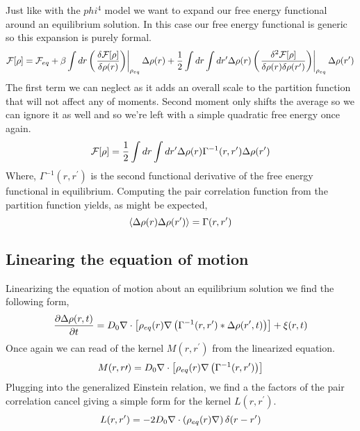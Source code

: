 Just like with the $phi^4$ model we want to expand our free energy functional
around an equilibrium solution. In this case our free energy functional is
generic so this expansion is purely formal.
%
\begin{equation} \mathcal{F}[\rho] = \mathcal{F}_{eq} + \beta\int dr \left(\left.\frac{\delta \mathcal{F}[\rho]}{\delta
\rho(r)}\right)\right\vert_{\rho_{eq}}\Delta\rho(r) + \frac{1}{2} \int dr \int dr^\prime
\Delta\rho(r) \left(\left.\frac{\delta^2 \mathcal{F}[\rho]}{\delta \rho(r) \delta
\rho(r^\prime)}\right)\right\vert_{\rho_{eq}} \Delta\rho(r^\prime) \end{equation}
%
The first term we can neglect as it adds an overall scale to the partition
function that will not affect any of moments. Second moment only shifts the
average so we can ignore it as well and so we're left with a simple quadratic
free energy once again.
%
\begin{equation} \mathcal{F}[\rho] = \frac{1}{2}\int dr \int dr^\prime \Delta \rho(r)
\Gamma^{-1}(r, r^\prime) \Delta \rho(r^\prime) \end{equation}
%
Where, $\Gamma^{-1}(r, r^\prime)$ is the second functional derivative of the
free energy functional in equilibrium. Computing the pair correlation function
from the partition function yields, as might be expected,
%
\begin{equation} \left\langle \Delta\rho(r) \Delta\rho(r^\prime) \right\rangle =
\Gamma(r, r^\prime) \end{equation}
%
\subsection{Linearing the equation of motion} %

Linearizing the equation of motion about an equilibrium solution we find the
following form,
%
\begin{equation} \frac{\partial \Delta \rho (r, t)}{\partial t} = D_0\nabla \cdot
\left[\rho_{eq}(r)\nabla \left(\Gamma^{-1}(r, r^\prime)\ast \Delta\rho(r^\prime,
t)\right)\right] + \xi(r, t) \end{equation}
%
Once again we can read of the kernel $M(r, r^\prime)$ from the linearized
equation.
%
\begin{equation} M(r, r\prime) = D_0\nabla \cdot \left[\rho_{eq}(r)\nabla
\left(\Gamma^{-1}(r, r^\prime)\right)\right] \end{equation}
%
Plugging into the generalized Einstein relation, we find a the factors of the
pair correlation cancel giving a simple form for the kernel $L(r, r^\prime)$.
%
\begin{equation} L(r, r^\prime) =
-2D_0\nabla\cdot\left(\rho_{eq}(r)\nabla\right)\delta(r - r^\prime) \end{equation}
%

\nocite{Ronis, Fox_and_Uhlenbeck, Lax}
